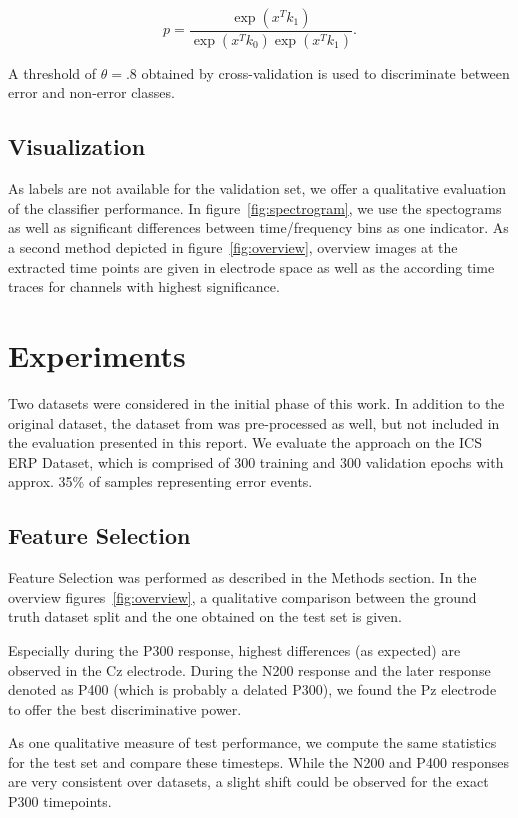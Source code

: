 \documentclass[10pt,a4paper]{article}
\begin{document}
\begin{equation}
    p = \frac{\exp(x^T k_1)}{\exp(x^T k_0)\exp(x^T k_1)}.
\end{equation}

A threshold of $\theta = .8$ obtained by cross-validation is used to discriminate between error and non-error classes.

\subsection{Visualization}

As labels are not available for the validation set, we offer a qualitative evaluation of the classifier performance.
In figure~\ref{fig:spectrogram}, we use the spectograms as well as significant differences between time/frequency bins as one indicator.
As a second method depicted in figure~\ref{fig:overview}, overview images at the extracted time points are given in electrode space as well as the according time traces for channels with highest significance.

\section{Experiments}

Two datasets were considered in the initial phase of this work.
In addition to the original dataset, the dataset from \cite{Spuler2015} was pre-processed as well, but not included in the evaluation presented in this report.
We evaluate the approach on the ICS ERP Dataset, which is comprised of 300 training and 300 validation epochs with approx. 35\% of samples representing error events.

\subsection{Feature Selection}

Feature Selection was performed as described in the Methods section.
In the overview figures~\ref{fig:overview}, a qualitative comparison between the ground truth dataset split and the one obtained on the test set is given.

Especially during the P300 response, highest differences (as expected) are observed in the Cz electrode.
During the N200 response and the later response denoted as P400 (which is probably a delated P300), we found the Pz electrode to offer the best discriminative power.

As one qualitative measure of test performance, we compute the same statistics for the test set and compare these timesteps.
While the N200 and P400 responses are very consistent over datasets, a slight shift could be observed for the exact P300 timepoints.
\end{document}
